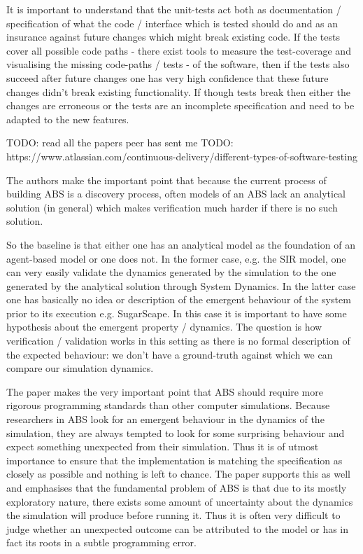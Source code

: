 It is important to understand that the unit-tests act both as documentation / specification of what the code / interface which is tested should do and as an insurance against future changes which might break existing code. If the tests cover all possible code paths - there exist tools to measure the test-coverage and visualising the missing code-paths / tests - of the software, then if the tests also succeed after future changes one has very high confidence that these future changes didn't break existing functionality. If though tests break then either the changes are erroneous or the tests are an incomplete specification and need to be adapted to the new features.

TODO: read all the papers peer has sent me
TODO: https://www.atlassian.com/continuous-delivery/different-types-of-software-testing


The authors \cite{ormerod_validation_2006} make the important point that because the current process of building ABS is a discovery process, often models of an ABS lack an analytical solution (in general) which makes verification much harder if there is no such solution.

So the baseline is that either one has an analytical model as the foundation of an agent-based model or one does not. In the former case, e.g. the SIR model, one can very easily validate the dynamics generated by the simulation to the one generated by the analytical solution through System Dynamics. In the latter case one has basically no idea or description of the emergent behaviour of the system prior to its execution e.g. SugarScape. In this case it is important to have some hypothesis about the emergent property / dynamics. The question is how verification / validation works in this setting as there is no formal description of the expected behaviour: we don't have a ground-truth against which we can compare our simulation dynamics.

The paper \cite{polhill_ghost_2005} makes the very important point that ABS should require more rigorous programming standards than other computer simulations. Because researchers in ABS look for an emergent behaviour in the dynamics of the simulation, they are always tempted to look for some surprising behaviour and expect something unexpected from their simulation. Thus it is of utmost importance to ensure that the implementation is matching the specification as closely as possible and nothing is left to chance. The paper \cite{galan_errors_2009} supports this as well and emphasises that the fundamental problem of ABS is that due to its mostly exploratory nature, there exists some amount of uncertainty about the dynamics the simulation will produce before running it. Thus it is often very difficult to judge whether an unexpected outcome can be attributed to the model or has in fact its roots in a subtle programming error.

